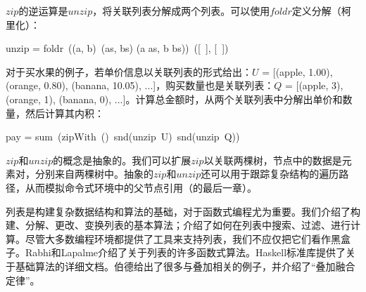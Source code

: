 \documentclass[b5paper]{ctexart}
\begin{document}
$zip$的逆运算是$unzip$，将关联列表分解成两个列表。可以使用$foldr$定义分解（柯里化）：

\be
unzip = foldr\ ((a, b)\ (as, bs) \mapsto (a \cons as, b \cons bs))\ ([\ ], [\ ])
\ee

对于买水果的例子，若单价信息以关联列表的形式给出：$U$ = [(apple, 1.00), (orange, 0.80), (banana, 10.05), ...]，购买数量也是关联列表：$Q$ = [(apple, 3), (orange, 1), (banana, 0), ...]。计算总金额时，从两个关联列表中分解出单价和数量，然后计算其内积：

\be
pay = sum\ (zipWith\ (\cdot)\ snd(unzip\ U)\ snd(unzip\ Q))
\ee

$zip$和$unzip$的概念是抽象的。我们可以扩展$zip$以关联两棵树，节点中的数据是元素对，分别来自两棵树中。抽象的$zip$和$unzip$还可以用于跟踪复杂结构的遍历路径，从而模拟命令式环境中的父节点引用（\cite{learn-haskell}的最后一章）。

列表是构建复杂数据结构和算法的基础，对于函数式编程尤为重要。我们介绍了构建、分解、更改、变换列表的基本算法；介绍了如何在列表中搜索、过滤、进行计算。尽管大多数编程环境都提供了工具来支持列表，我们不应仅把它们看作黑盒子。Rabhi和Lapalme\cite{algo-fp}介绍了关于列表的许多函数式算法。Haskell标准库提供了关于基础算法的详细文档。伯德\cite{fp-pearls}给出了很多与叠加相关的例子，并介绍了“叠加融合定律”。
\end{document}
